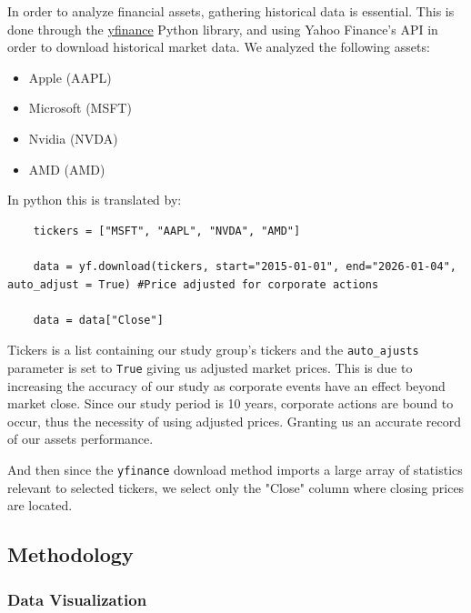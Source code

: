 \documentclass{article}
\begin{document}
In order to analyze financial assets, gathering historical data is essential. This is done through the \textcolor{blue}{\href{https://pypi.org/project/yfinance/}{yfinance}} Python library, and using Yahoo Finance's API in order to download historical market data. We analyzed the following assets: 


\vspace{0.3cm}

\begin{itemize}
    \item Apple (AAPL)
    \item Microsoft (MSFT)
    \item Nvidia (NVDA)
    \item AMD (AMD)
\end{itemize}
\vspace{0.3cm}
In python this is translated by: 

\begin{lstlisting}
    tickers = ["MSFT", "AAPL", "NVDA", "AMD"]

    data = yf.download(tickers, start="2015-01-01", end="2026-01-04", auto_adjust = True) #Price adjusted for corporate actions

    data = data["Close"]
\end{lstlisting}

\vspace{0.3cm}

Tickers is a list containing our study group's tickers and the \texttt{auto\_ajusts} parameter is set to \texttt{True} giving us adjusted market prices. This is due to increasing the accuracy of our study as corporate events have an effect beyond market close. Since our study period is 10 years, corporate actions are bound to occur, thus the necessity of using adjusted prices. Granting us an accurate record of our assets performance.

\pagebreak


And then since the \texttt{yfinance} download method imports a large array of statistics relevant to selected tickers, we select only the "Close" column where closing prices are located.


\subsection{Methodology}

\subsubsection{Data Visualization}
\end{document}
